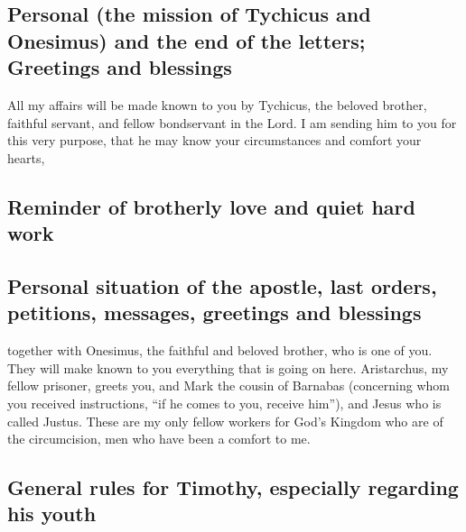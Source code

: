 \hypertarget{personal-the-mission-of-tychicus-and-onesimus-and-the-end-of-the-letters-greetings-and-blessings}{%
\subsection{Personal (the mission of Tychicus and Onesimus) and the end
of the letters; Greetings and
blessings}\label{personal-the-mission-of-tychicus-and-onesimus-and-the-end-of-the-letters-greetings-and-blessings}}

 All my affairs will be made known to you by Tychicus, the
beloved brother, faithful servant, and fellow bondservant in the Lord.
 I am sending him to you for this very purpose, that he
may know your circumstances and comfort your hearts,

\hypertarget{reminder-of-brotherly-love-and-quiet-hard-work}{%
\subsection{Reminder of brotherly love and quiet hard
work}\label{reminder-of-brotherly-love-and-quiet-hard-work}}

\hypertarget{personal-situation-of-the-apostle-last-orders-petitions-messages-greetings-and-blessings}{%
\subsection{Personal situation of the apostle, last orders, petitions,
messages, greetings and
blessings}\label{personal-situation-of-the-apostle-last-orders-petitions-messages-greetings-and-blessings}}

 together with Onesimus, the faithful and beloved brother,
who is one of you. They will make known to you everything that is going
on here.  Aristarchus, my fellow prisoner, greets you,
and Mark the cousin of Barnabas (concerning whom you received
instructions, ``if he comes to you, receive him''),  and
Jesus who is called Justus. These are my only fellow workers for God's
Kingdom who are of the circumcision, men who have been a comfort to me.

\hypertarget{general-rules-for-timothy-especially-regarding-his-youth}{%
\subsection{General rules for Timothy, especially regarding his
youth}\label{general-rules-for-timothy-especially-regarding-his-youth}}

